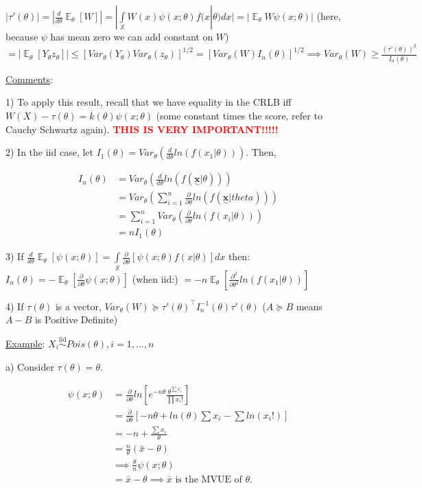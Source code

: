 \documentclass{article}
\newcommand{\statvec}[1]{\underset{\sim}{\bm{#1}}} %
\DeclareMathOperator{\EX}{\mathbb{E}} %
\let\Oldint=\int
\let\Oldsum=\sum
\let\Oldprod=\prod
\renewcommand{\int}{\Oldint\limits}
\renewcommand{\sum}{\Oldsum\limits}
\renewcommand{\prod}{\Oldprod\limits}
\newcommand{\iiddist}{\overset{\mathrm{iid}}{\sim}}
\newcommand{\boldred}[1]{\textbf{\textcolor{red}{#1}}}
\begin{document}
$|\tau'(\theta)| = |\frac{d}{d\theta}\EX_{\theta}[W]| = |\int_{\mathbb{X}} W(x)\psi(x;\theta)f(x|\theta)dx| = |\EX_{\theta}W \psi(x;\theta)|$ (here, because $\psi$ has mean zero we can add constant on $W$) $ = |\EX_{\theta}[Y_{\theta}z_{\theta}]| \le [Var_{\theta}(Y_{\theta})Var_{\theta}(z_{\theta})]^{1/2} = [Var_{\theta}(W)I_n(\theta)]^{1/2} \implies Var_{\theta}(W) \ge \frac{(\tau'(\theta))^2}{I_n(\theta)}$


\underline{Comments}: 

1) To apply this result, recall that we have equality in the CRLB iff $W(X) - \tau(\theta)  = k(\theta)\psi(x;\theta)$ (some constant times the score, refer to Cauchy Schwartz again). \boldred{THIS IS VERY IMPORTANT!!!!!}

2) In the iid case, let $I_1(\theta) = Var_{\theta}(\frac{d}{d\theta}ln(f(x_1|\theta)))$. Then, 

$$
\begin{aligned}
    I_n(\theta) 
    &= Var_{\theta}(\frac{d}{d\theta}ln(f(\statvec{x}|\theta))) \\
    &= Var_{\theta}(\sum_{i=1}^n \frac{\partial}{\partial \theta} ln(f(\statvec{x}|theta))) \\
    &= \sum_{i=1}^n Var_{\theta}(\frac{\partial}{\partial \theta} ln(f(x_i|\theta))) \\
    &= nI_1(\theta)
\end{aligned}
$$

3) If $\frac{d}{d \theta} \EX_{\theta}[\psi(x;\theta)] = \int_{\mathbb{X}} \frac{\partial}{\partial \theta}[\psi(x;\theta)f(x|\theta)]dx$ then: $I_n(\theta) = -\EX_{\theta}[\frac{\partial}{\partial \theta} \psi(x;\theta)]$ (when iid:) $= -n\EX_{\theta}[\frac{\partial^2}{\partial \theta^2} ln(f(x_1|\theta))]$

4) If $\tau(\theta)$ is a vector, $Var_{\theta}(W) \succeq \tau'(\theta)^{\top}I_n^{-1}(\theta)\tau'(\theta)$ ($A \succeq B$ means $A-B$ is Positive Definite)

\underline{Example}: $X_i \iiddist Pois(\theta), i = 1, ..., n$

a) Consider $\tau(\theta) = \theta$. 

$$
\begin{aligned}
\psi(x;\theta) 
&= \frac{\partial}{\partial \theta}ln[e^{-n\theta}\frac{\theta^{\sum x_i}}{\prod x_i !}] \\
&= \frac{\partial}{\partial \theta}[-n\theta + ln(\theta)\sum x_i - \sum ln(x_i !)] \\
&= -n + \frac{\sum x_i}{\theta} \\
&= \frac{n}{\theta}(\bar{x} - \theta) \\
&\implies \frac{\theta}{n} \psi(x;\theta) \\
&= \bar{x} - \theta \implies \bar{x} \text{ is the MVUE of } \theta.
\end{aligned}
$$
\end{document}
